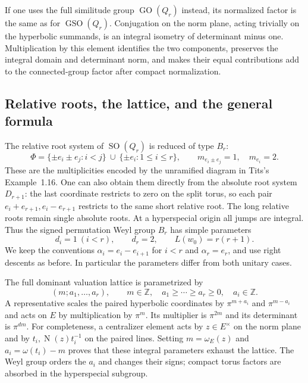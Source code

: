 \documentclass[11pt,a4paper]{article}
\theoremstyle{definition}
\newcommand{\Z}{\mathbb Z}
\newcommand{\GSO}{\operatorname{GSO}}
\newcommand{\GO}{\operatorname{GO}}
\newcommand{\SO}{\operatorname{SO}}
\newcommand{\N}{\operatorname N}
\begin{document}
If one uses the full similitude group $\GO(Q_r)$ instead, its
normalized factor is the same as for $\GSO(Q_r)$. Conjugation on
the norm plane, acting trivially on the hyperbolic summands, is an
integral isometry of determinant minus one. Multiplication by this
element identifies the two components, preserves the integral domain
and determinant norm, and makes their equal contributions add to the
connected-group factor after compact normalization.

\subsection{Relative roots, the lattice, and the general formula}
The relative root system of $\SO(Q_r)$ is reduced of type $B_r$:
\begin{equation}\label{eq:orthogonalroots}
 \Phi=\{\pm e_i\pm e_j:i<j\}\ \cup\ \{\pm e_i:1\leq i\leq r\},
 \qquad m_{e_i\pm e_j}=1,\quad m_{e_i}=2.
\end{equation}
These are the multiplicities encoded by the unramified diagram in
Tits's Example~1.16. One can also obtain them directly from the
absolute root system $D_{r+1}$: the last coordinate restricts to zero
on the split torus, so each pair $e_i+e_{r+1},e_i-e_{r+1}$ restricts
to the same short relative root. The long relative roots remain
single absolute roots. At a hyperspecial origin all jumps are
integral. Thus the signed permutation Weyl group $B_r$ has simple
parameters
\begin{equation}\label{eq:orthogonalparameters}
 d_i=1\ (i<r),\qquad d_r=2,\qquad L(w_0)=r(r+1).
\end{equation}
We keep the conventions $\alpha_i=e_i-e_{i+1}$ for $i<r$ and
$\alpha_r=e_r$, and use right descents as before. In particular
the parameters differ from both unitary cases.

The full dominant valuation lattice is parametrized by
\[
 (m;a_1,\ldots,a_r),\qquad
 m\in\Z,\quad a_1\geq\cdots\geq a_r\geq0,\quad a_i\in\Z.
\]
A representative scales the paired hyperbolic coordinates by
$\pi^{m+a_i}$ and $\pi^{m-a_i}$ and acts on $E$ by multiplication
by $\pi^m$. Its multiplier is $\pi^{2m}$ and its determinant is
$\pi^{dm}$. For completeness, a centralizer element acts by
$z\in E^\times$ on the norm plane and by $t_i,\N(z)t_i^{-1}$ on
the paired lines. Setting $m=\omega_E(z)$ and
$a_i=\omega(t_i)-m$ proves that these integral parameters exhaust
the lattice. The Weyl group orders the $a_i$ and changes their signs;
compact torus factors are absorbed in the hyperspecial subgroup.
\end{document}
